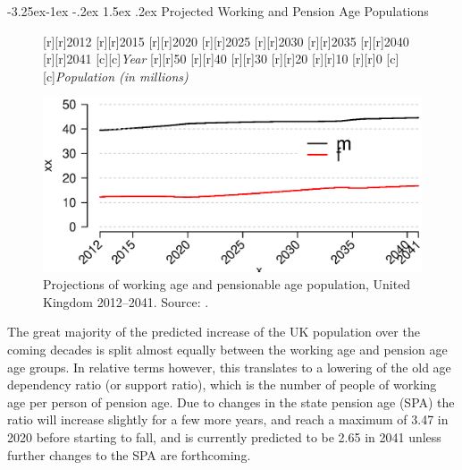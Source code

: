 \documentclass[11 pt, a4paper]{report}
\makeatletter
\renewcommand\subsection{\@startsection{subsection}{2}{\z@}%
                                     {-3.25ex\@plus -1ex \@minus -.2ex}%
                                     {1.5ex \@plus .2ex}%
    								{\large\scshape}}
\makeatother
\begin{document}
\clearpage
\subsection{Projected Working and Pension Age Populations}

\begin{figure}[hbtp!]
[r][r]{\small{2012}}
[r][r]{\small{2015}}
[r][r]{\small{2020}}
[r][r]{\small{2025}}
[r][r]{\small{2030}}
[r][r]{\small{2035}}
[r][r]{\small{2040}}
[r][r]{\small{2041}}
[c][c]{\normalsize{\emph{Year}}}
[r][r]{\small{50}}
[r][r]{\small{40}}
[r][r]{\small{30}}
[r][r]{\small{20}}
[r][r]{\small{10}}
[r][r]{\small{0}}
[c][c]{\small{\emph{Population (in millions)}}}

\includegraphics[width=\textwidth]{../figures/Fig4.3.eps}
\caption{Projections of working age and pensionable age population\protect \footnotemark, United Kingdom 2012--2041. Source: \citet{ONS2013c}.}
 
\label{Fig:14}
\end{figure}

The great majority of the predicted increase of the UK population over the coming decades is split almost equally between the working age and pension age age groups. In relative terms however, this translates to a lowering of the old age dependency ratio (or support ratio), which is the number of people of working age per person of pension age. Due to changes in the state pension age (SPA) the ratio will increase slightly for a few more years, and reach a maximum of 3.47 in 2020 before starting to fall, and is currently predicted to be 2.65 in 2041 unless further changes to the SPA are forthcoming. 


\end{document}
